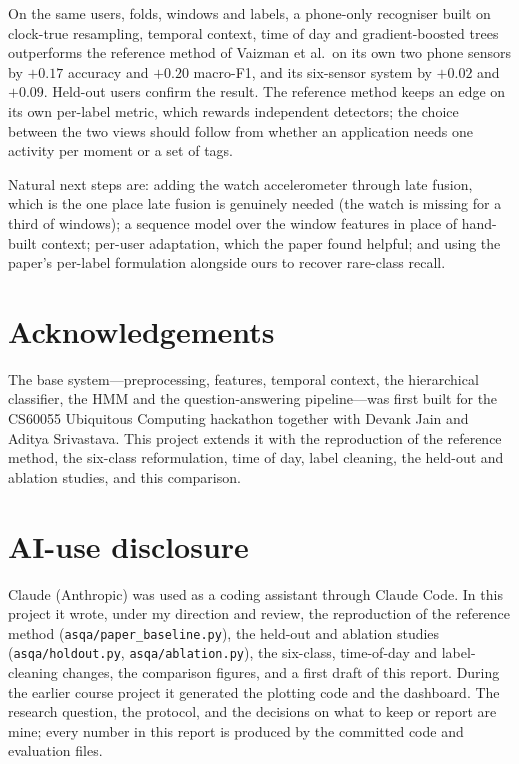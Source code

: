 \documentclass[11pt,a4paper]{article}
\newcommand{\code}[1]{\texttt{\small #1}}
\begin{document}
On the same users, folds, windows and labels, a phone-only recogniser built on clock-true
resampling, temporal context, time of day and gradient-boosted trees outperforms the
reference method of Vaizman et al.\ on its own two phone sensors by $+0.17$ accuracy and
$+0.20$ macro-F1, and its six-sensor system by $+0.02$ and $+0.09$. Held-out users confirm
the result. The reference method keeps an edge on its own per-label metric, which rewards
independent detectors; the choice between the two views should follow from whether an
application needs one activity per moment or a set of tags.

Natural next steps are: adding the watch accelerometer through late fusion, which is the
one place late fusion is genuinely needed (the watch is missing for a third of windows);
a sequence model over the window features in place of hand-built context; per-user
adaptation, which the paper found helpful; and using the paper's per-label formulation
alongside ours to recover rare-class recall.

\section*{Acknowledgements}
The base system---preprocessing, features, temporal context, the hierarchical classifier,
the HMM and the question-answering pipeline---was first built for the CS60055 Ubiquitous
Computing hackathon together with Devank Jain and Aditya Srivastava. This project extends
it with the reproduction of the reference method, the six-class reformulation, time of
day, label cleaning, the held-out and ablation studies, and this comparison.

\section*{AI-use disclosure}
Claude (Anthropic) was used as a coding assistant through Claude Code. In this project it
wrote, under my direction and review, the reproduction of the reference method
(\code{asqa/paper\_baseline.py}), the held-out and ablation studies
(\code{asqa/holdout.py}, \code{asqa/ablation.py}), the six-class, time-of-day and
label-cleaning changes, the comparison figures, and a first draft of this report. During
the earlier course project it generated the plotting code and the dashboard. The research
question, the protocol, and the decisions on what to keep or report are mine; every number
in this report is produced by the committed code and evaluation files.
\end{document}
